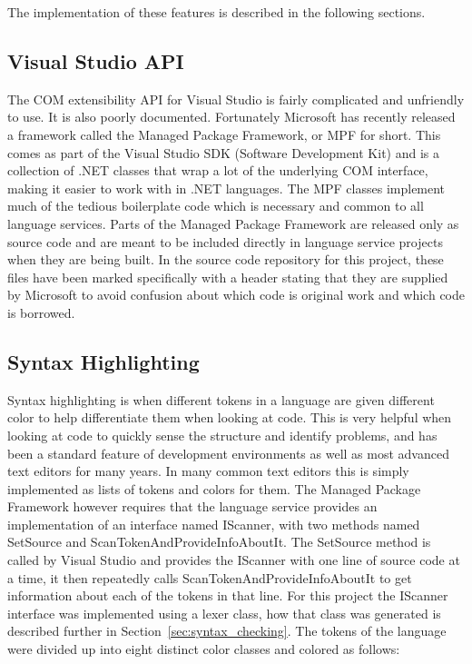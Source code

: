 	The implementation of these features is described in the following 
	sections.

	
	\subsection{Visual Studio API}	
	The COM extensibility API for Visual Studio is fairly complicated and 
	unfriendly to use. It is also poorly documented. Fortunately Microsoft has 
	recently released a framework called the Managed Package Framework, or MPF 
	for short. This comes as part of the Visual Studio SDK (Software Development 
	Kit) and is a collection of .NET classes that wrap a lot of the underlying 
	COM interface, making it easier to work with in .NET languages. 
	The MPF classes implement much of the tedious boilerplate code which is 
	necessary and common to all language services. Parts of the Managed Package 
	Framework are released only as source code and are meant to be included 
	directly in language service projects when they are being built. In the 
	source code repository for this project, these files have been marked 
	specifically with a header stating that they are supplied by Microsoft to 
	avoid confusion about which code is original work and which code is 
	borrowed. 

	\subsection{Syntax Highlighting}
	Syntax highlighting is when different tokens in a language are given 
	different color to help differentiate them when looking at code. This
	is very helpful when looking at code to quickly sense the structure and
	identify problems, and has been a standard feature of development 
	environments as well as most advanced text editors for many years. In many
	common text editors this is simply implemented as lists of tokens and 
	colors for them. The Managed Package Framework however requires that the 
	language service provides an implementation of an interface named 
	\textsf{IScanner}, with two methods named \textsf{SetSource} and
	\textsf{ScanTokenAndProvideInfoAboutIt}. The \textsf{SetSource} method is 
	called by Visual Studio and provides the \textsf{IScanner} with one line of 
	source code at a time, it then repeatedly calls 
	\textsf{ScanTokenAndProvideInfoAboutIt} to get information about each of the 
	tokens in that line. For this project the \textsf{IScanner} interface was 
	implemented using a lexer class, how that class was generated is described 
	further in Section~\ref{sec:syntax_checking}. The tokens of the language 
	were divided up into eight distinct color classes and colored as follows:
	
